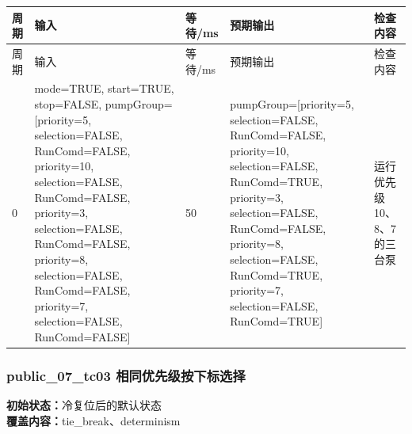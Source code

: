 \begin{longtable}{L{1.0cm}L{4.7cm}L{1.4cm}L{4.0cm}L{2.1cm}}

\toprule

周期 & 输入 & 等待/ms & 预期输出 & 检查内容\\

\midrule

\endfirsthead

\toprule

周期 & 输入 & 等待/ms & 预期输出 & 检查内容\\

\midrule

\endhead

0 & mode=TRUE, start=TRUE, stop=FALSE, pumpGroup=[priority=5, selection=FALSE, RunComd=FALSE, priority=10, selection=FALSE, RunComd=FALSE, priority=3, selection=FALSE, RunComd=FALSE, priority=8, selection=FALSE, RunComd=FALSE, priority=7, selection=FALSE, RunComd=FALSE] & 50 & pumpGroup=[priority=5, selection=FALSE, RunComd=FALSE, priority=10, selection=FALSE, RunComd=TRUE, priority=3, selection=FALSE, RunComd=FALSE, priority=8, selection=FALSE, RunComd=TRUE, priority=7, selection=FALSE, RunComd=TRUE] & 运行优先级 10、8、7 的三台泵\\

\bottomrule

\end{longtable}

\subsubsection{{\ttfamily public\_07\_tc03} 相同优先级按下标选择}

\noindent\textbf{初始状态：}冷复位后的默认状态\\

\textbf{覆盖内容：}tie\_break、determinism

